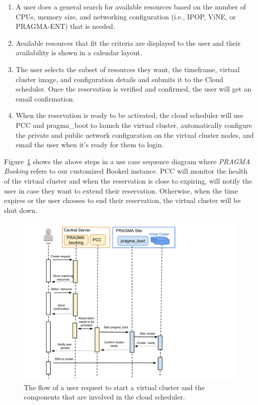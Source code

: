 \documentclass{acm_proc_article-sp}
\begin{document}
\begin{enumerate}
\item A user does a general search for available resources based on the number of CPUs, memory size, and networking configuration (i.e., IPOP, ViNE, or PRAGMA-ENT) that is needed.  
\item Available resources that fit the criteria are displayed to the user and their availability is shown in a calendar layout.  
\item The user selects the subset of resources they want, the timeframe, virtual cluster image, and configuration details and submits it to the Cloud scheduler.  Once the reservation is verified and confirmed, the user will get an email confirmation.  
\item When the reservation is ready to be activated, the cloud scheduler will use PCC and pragma\_boot to launch the virtual cluster, automatically configure the private and public network configuration on the virtual cluster nodes, and email the user when it's ready for them to login.   
\end{enumerate}

Figure~\ref{Fig:Flow} shows the above steps in a use case sequence diagram where \textit{PRAGMA Booking} refers to our customized Booked instance.  PCC will monitor the health of the virtual cluster and when the reservation is close to expiring, will notify the user in case they want to extend their reservation.  Otherwise, when the time expires or the user chooses to end their reservation, the virtual cluster will be shut down.

\begin{figure}[htbp]
\begin{center}
\includegraphics[width=\columnwidth]{figures/flow.pdf}
\caption{The flow of a user request to start a virtual cluster and the components that are involved in the cloud scheduler.}
\label{Fig:Flow}
\end{center}
\end{figure}
\end{document}
